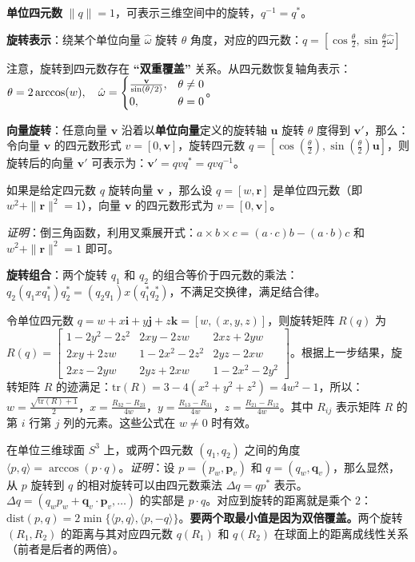 \documentclass[
  8pt]{extarticle}
\begin{document}
\begin{multicols*}{4}
\textbf{单位四元数}
\(\|q\| = 1\)，可表示三维空间中的旋转，\(q^{-1} = q^*\)。

\textbf{旋转表示}：绕某个单位向量 \(\hat{\omega}\) 旋转 \(\theta\)
角度，对应的四元数：\(q = \left[\cos\frac{\theta}{2}, \sin\frac{\theta}{2} \hat{\omega}\right]\)

注意，旋转到四元数存在 \textbf{``双重覆盖''}
关系。从四元数恢复轴角表示：\(\theta = 2 \arccos(w), \quad \hat{\omega} =\begin{cases}\frac{\bold{v}}{\sin(\theta/2)}, & \theta \neq 0 \\0, & \theta = 0\end{cases}\)。

\textbf{向量旋转}：任意向量 \(\mathbf{v}\)
沿着以\textbf{单位向量}定义的旋转轴 \(\mathbf{u}\) 旋转 \(\theta\)
度得到 \(\mathbf{v}'\)，那么：令向量 \(\mathbf{v}\) 的四元数形式
\(v = [0, \mathbf{v}]\)，旋转四元数
\(q = \left[\cos\left(\frac{\theta}{2}\right), \sin\left(\frac{\theta}{2}\right)\mathbf{u}\right]\)，则旋转后的向量
\(\mathbf{v}'\) 可表示为：\(\mathbf{v}' = qv q^* = qv q^{-1}\)。

如果是给定四元数 \(q\) 旋转向量 \(\mathbf{v}\) ，那么设
\(q = [w, \mathbf{r}]\) 是单位四元数（即
\(w^2 + \|\mathbf{r}\|^2 = 1\)），向量 \(\mathbf{v}\) 的四元数形式为
\(v = [0, \mathbf{v}]\)。

\emph{证明}：倒三角函数，利用叉乘展开式：\(a \times b \times c = (a \cdot c)b - (a \cdot b)c\)
和 \(w^2 + \|\mathbf{r}\|^2 = 1\) 即可。

\textbf{旋转组合}：两个旋转 \(q_1\) 和 \(q_2\)
的组合等价于四元数的乘法：\(q_2 (q_1 x q_1^*) q_2^* = (q_2 q_1) x (q_1^* q_2^*)\)，不满足交换律，满足结合律。

令单位四元数
\(q = w + x\mathbf{i} + y\mathbf{j} + z\mathbf{k} = [w, (x, y, z)]\)，则旋转矩阵
\(R(q)\) 为
\(R(q) = \begin{bmatrix} 1 - 2y^2 - 2z^2 & 2xy - 2zw & 2xz + 2yw \\ 2xy + 2zw & 1 - 2x^2 - 2z^2 & 2yz - 2xw \\ 2xz - 2yw & 2yz + 2xw & 1 - 2x^2 - 2y^2 \end{bmatrix}\)。根据上一步结果，旋转矩阵
\(R\)
的迹满足：\(\text{tr}(R) = 3 - 4(x^2 + y^2 + z^2) = 4w^2 - 1\)，所以：\(w = \frac{\sqrt{\text{tr}(R)+1}}{2}，x = \frac{R_{32}-R_{23}}{4w}，y = \frac{R_{13}-R_{31}}{4w}，z = \frac{R_{21}-R_{12}}{4w}\)。其中
\(R_{ij}\) 表示矩阵 \(R\) 的第 \(i\) 行第 \(j\) 列的元素。这些公式在
\(w \neq 0\) 时有效。

在单位三维球面 \(S^3\) 上，或两个四元数 \((q_1, q_2)\) 之间的角度
\(\langle p, q \rangle = \arccos(p \cdot q)\)。\emph{证明}：设
\(p = (p_w, \mathbf{p}_v)\) 和 \(q = (q_w, \mathbf{q}_v)\)，那么显然，从
\(p\) 旋转到 \(q\) 的相对旋转可以由四元数乘法 \(\Delta q = q p^*\)
表示。\(\Delta q = (q_w p_w + \mathbf{q}_v \cdot \mathbf{p}_v, \dots)\)
的实部是 \(p \cdot q\)。对应到旋转的距离就是乘个
\(2\)：\(\text{dist}(p, q) = 2 \min \{\langle p, q \rangle, \langle p, -q \rangle\}\)。\textbf{要两个取最小值是因为双倍覆盖。}两个旋转
\((R_1, R_2)\) 的距离与其对应四元数 \(q(R_1)\) 和 \(q(R_2)\)
在球面上的距离成线性关系（前者是后者的两倍）。


\end{multicols*}
\end{document}

